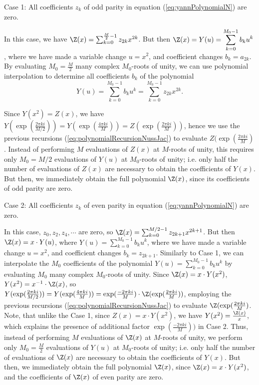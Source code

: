 \noindent
{\sc Case 1}: All coefficients $z_k$ of odd parity in
equation (\ref{eq:yannPolynomialN}) are zero.
\smallskip

\noindent
In this case, we have
$\Z(x) = \sum_{k=0}^{\frac{M}{2}-1} z_{2k} x^{2k}$. But then
$\Z(x) = Y(u) = \displaystyle\sum_{k=0}^{M_0-1} b_k u^k$,
where we have made a variable change $u=x^2$, and coefficient changes
$b_k = a_{2k}$.
By evaluating $M_0=\frac{M}{2}$ many complex
$M_0$-roots of unity, we can
use polynomial interpolation to determine all coefficients $b_k$ of
the polynomial
\[
Y(u) = \displaystyle\sum_{k=0}^{M_0-1} b_k u^k =
\displaystyle\sum_{k=0}^{M_0-1} z_{2k} x^{2k}.
\]


Since $Y(x^2)=Z(x)$, we have
$Y(\exp(\frac{2\pi k i}{M/2})) =
Y(\exp(\frac{4\pi k i}{M})) =
Z(\exp(\frac{2\pi k i}{M}))$, hence we
use the previous recursions (\ref{eq:polynomialRecursionNussJac})
to evaluate $Z(\exp(\frac{2\pi ki}{M})$.  Instead of
performing $M$ evaluations of $Z(x)$ at $M$-roots of unity,
this requires only $M_0=M/2$ evaluations of $Y(u)$ at
$M_0$-roots of unity; i.e. only half the number of
evaluations of $Z(x)$ are necessary to
obtain the coefficients of $Y(x)$. But then, we immediately obtain the
full polynomial $\Z(x)$, since its coefficients of odd  parity are zero.
\medskip

\noindent
{\sc Case 2}: All coefficients $z_k$ of even parity in
equation (\ref{eq:yannPolynomialN}) are zero.
\smallskip

\noindent
In this case, $z_0,z_2,z_4,\cdots$ are zero, so
$\Z(x) = \sum_{k=0}^{M/2-1} z_{2k+1} x^{2k+1}$. But then
$\Z(x) = x \cdot Y(u)$, where
$Y(u)= \sum_{k=0}^{M_0-1} b_k u^k$, where we have made
a variable change $u=x^2$, and coefficient changes
$b_k = z_{2k+1}$. Similarly to Case 1,
we can interpolate the $M_0$ coefficients of the polynomial
$Y(u) = \displaystyle\sum_{k=0}^{M_0-1} b_k u^k$
by evaluating $M_0$ many complex $M_0$-roots
of unity.  Since $\Z(x)=x \cdot Y(x^2)$, $Y(x^2) = x^{-1} \cdot \Z(x)$,
so
$Y(\exp(\frac{2\pi ki}{M/2})) = Y(\exp(\frac{4\pi ki}{M})) =
\exp(\frac{-2\pi ki}{M}) \cdot
\Z(\exp(\frac{2\pi ki}{M}))$, employing
the previous recursions (\ref{eq:polynomialRecursionNussJac})
to evaluate $\Z(\exp(\frac{2\pi ki}{M})$.  Note, that unlike the
Case 1, since $Z(x)=x \cdot Y(x^2)$, we have
$Y(x^2)=\frac{\Z(x)}{x}$, which explains the presence of additional factor
$\exp(\frac{-2\pi ki}{M}))$ in Case 2.  Thus, instead of
performing $M$ evaluations of $\Z(x)$ at $M$-roots of unity,
we perform only $M_0=\frac{M}{2}$ evaluations of $Y(u)$ at
$M_0$-roots of unity; i.e. only half the number of
evaluations of $\Z(x)$ are necessary to
obtain the coefficients of $Y(x)$. But then, we immediately obtain the
full polynomial $\Z(x)$, since $\Z(x) = x \cdot Y(x^2)$, and the
coefficients of $\Z(x)$ of even parity are zero.

